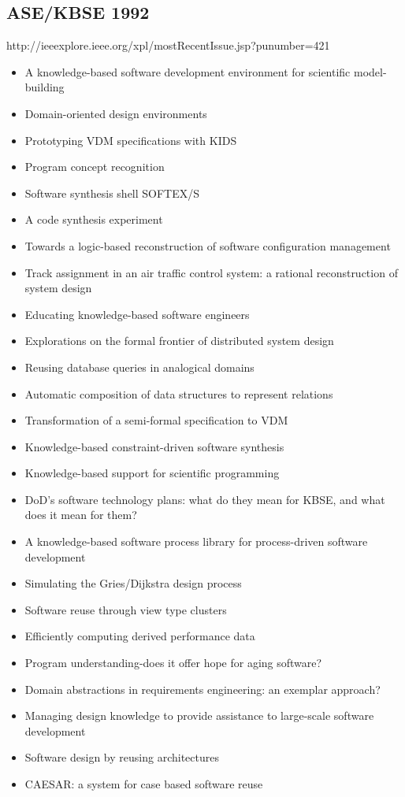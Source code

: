 \subsection{ASE/KBSE 1992}

http://ieeexplore.ieee.org/xpl/mostRecentIssue.jsp?punumber=421

{\small
\begin{itemize}[itemsep=-1ex]
  \item A knowledge-based software development environment for scientific model-building
  \item Domain-oriented design environments
  \item Prototyping VDM specifications with KIDS
  \item Program concept recognition
  \item Software synthesis shell SOFTEX/S
  \item A code synthesis experiment
  \item Towards a logic-based reconstruction of software configuration management
  \item Track assignment in an air traffic control system: a rational reconstruction of system design
  \item Educating knowledge-based software engineers
  \item Explorations on the formal frontier of distributed system design
  \item Reusing database queries in analogical domains
  \item Automatic composition of data structures to represent relations
  \item Transformation of a semi-formal specification to VDM
  \item Knowledge-based constraint-driven software synthesis
  \item Knowledge-based support for scientific programming
  \item DoD's software technology plans: what do they mean for KBSE, and what does it mean for them?
  \item A knowledge-based software process library for process-driven software development
  \item Simulating the Gries/Dijkstra design process
  \item Software reuse through view type clusters
  \item Efficiently computing derived performance data
  \item Program understanding-does it offer hope for aging software?
  \item Domain abstractions in requirements engineering: an exemplar approach?
  \item Managing design knowledge to provide assistance to large-scale software development
  \item Software design by reusing architectures
  \item CAESAR: a system for case based software reuse
\end{itemize}
}

